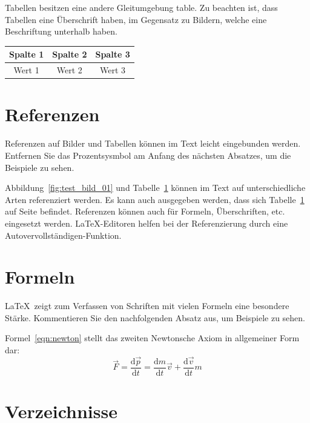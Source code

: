 \documentclass[ngerman,parskip]{scrbook}
\begin{document}
Tabellen besitzen eine andere Gleitumgebung \glqq table\grqq . Zu beachten ist,
dass Tabellen eine Überschrift haben, im Gegensatz zu Bildern, welche eine
Beschriftung unterhalb haben. 

\begin{table}[hbt]
	\centering
	\label{tab:test_tabelle_01}
	\begin{tabular}{ccc}
		\textbf{Spalte 1} & \textbf{Spalte 2} & \textbf{Spalte 3} \\
		\hline
		\hline
		Wert 1 & Wert 2 & Wert 3 \\
		\hline
	\end{tabular}
\end{table}

\chapter{Referenzen}

Referenzen auf Bilder und Tabellen können im Text leicht eingebunden werden.
Entfernen Sie das Prozentsysmbol am Anfang des nächsten Absatzes, um die
Beispiele zu sehen.

Abbildung~\ref{fig:test_bild_01} und Tabelle~\ref{tab:test_tabelle_01} können
im Text auf unterschiedliche Arten referenziert werden. Es kann auch ausgegeben
werden, dass sich Tabelle~\ref{tab:test_tabelle_01} auf Seite
\pageref{tab:test_tabelle_01} befindet. Referenzen können auch für Formeln,
Überschriften, etc. eingesetzt werden. \LaTeX-Editoren helfen bei der
Referenzierung durch eine Autovervollständigen-Funktion.

\chapter{Formeln}

\LaTeX\, zeigt zum Verfassen von Schriften mit vielen Formeln eine besondere Stärke. Kommentieren Sie den nachfolgenden Absatz aus, um Beispiele zu sehen.

Formel~\ref{eqn:newton} stellt das zweiten Newtonsche Axiom in allgemeiner Form dar:
\begin{equation}\label{eqn:newton}
\vec{F}= \dfrac{\text{d}\vec{p}}{\text{d}t}=\dfrac{\text{d}m}{\text{d}t}\vec{v}+\dfrac{\text{d}\vec{v}}{\text{d}t}m
\end{equation}


\chapter{Verzeichnisse}
\end{document}
